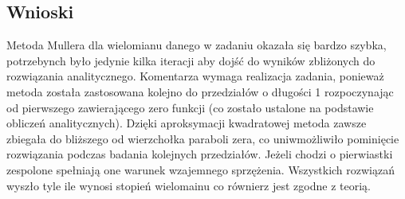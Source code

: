 \documentclass[a4paper, 11pt]{article}
\begin{document}
\subsection{Wnioski}
Metoda Mullera dla wielomianu danego w zadaniu okazała się bardzo szybka, potrzebynch było jedynie kilka iteracji aby dojść do wyników zbliżonych do rozwiązania analitycznego. Komentarza wymaga realizacja zadania, ponieważ metoda została zastosowana kolejno do przedziałów o długości 1 rozpoczynając od pierwszego zawierającego zero funkcji (co zostało ustalone na podstawie obliczeń analitycznych). Dzięki aproksymacji kwadratowej metoda zawsze zbiegała do bliższego od wierzchołka paraboli zera, co uniwmożliwiło pominięcie rozwiązania podczas badania kolejnych przedziałów. Jeżeli chodzi o pierwiastki zespolone spełniają one warunek wzajemnego sprzężenia. Wszystkich rozwiązań wyszło tyle ile wynosi stopień wielomainu co równierz jest zgodne z teorią. 
	
\end{document}
